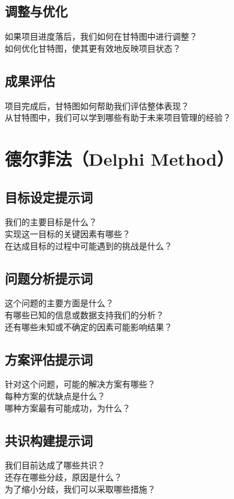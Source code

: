 \documentclass[12pt]{book}
\begin{document}
\subsection{调整与优化}
如果项目进度落后，我们如何在甘特图中进行调整？\\
如何优化甘特图，使其更有效地反映项目状态？\\

\subsection{成果评估}
项目完成后，甘特图如何帮助我们评估整体表现？\\
从甘特图中，我们可以学到哪些有助于未来项目管理的经验？\\


\section{德尔菲法（Delphi Method）}
\subsection{目标设定提示词}
我们的主要目标是什么？\\
实现这一目标的关键因素有哪些？\\
在达成目标的过程中可能遇到的挑战是什么？\\

\subsection{问题分析提示词}
这个问题的主要方面是什么？\\
有哪些已知的信息或数据支持我们的分析？\\
还有哪些未知或不确定的因素可能影响结果？\\

\subsection{方案评估提示词}
针对这个问题，可能的解决方案有哪些？\\
每种方案的优缺点是什么？\\
哪种方案最有可能成功，为什么？\\

\subsection{共识构建提示词}
我们目前达成了哪些共识？\\
还存在哪些分歧，原因是什么？\\
为了缩小分歧，我们可以采取哪些措施？\\
\end{document}
